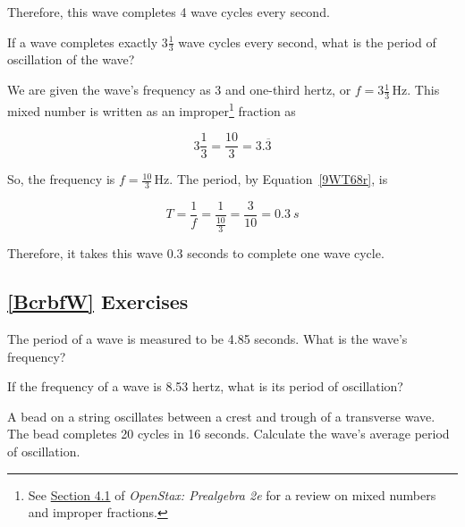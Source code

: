 \documentclass{article}
\numberwithin{equation}{section}
\numberwithin{figure}{section}
\begin{document}
Therefore, this wave completes 4 wave cycles every second.

\solutionEnd

\begin{example}
    If a wave completes exactly $3 \frac{1}{3}$ wave cycles every second, what is the period of oscillation of the wave? 
\end{example}

\Solution We are given the wave's frequency as 3 and one-third hertz, or $f = 3\frac{1}{3}\,\text{Hz}$. This mixed number is written as an improper\footnote{See \href{https://openstax.org/books/prealgebra-2e/pages/4-1-visualize-fractions}{Section 4.1} of \textit{OpenStax: Prealgebra 2e} for a review on mixed numbers and improper fractions.} fraction as

\begin{equation*}
    3 \frac{1}{3} = \frac{10}{3} = 3.\overline{3}
\end{equation*}

So, the frequency is $f = \frac{10}{3}\,\text{Hz}$. The period, by Equation~\eqref{9WT68r}, is

\begin{equation*}
    T = \frac{1}{f} = \frac{1}{\frac{10}{3}} = \frac{3}{10}  = \SI{0.3}{s}
\end{equation*}

Therefore, it takes this wave 0.3 seconds to complete one wave cycle. 

\solutionEnd

\subsection*{\ref{BcrbfW} Exercises}

\begin{exercise} \label{XGViXs}
    The period of a wave is measured to be 4.85 seconds. What is the wave's frequency?
\end{exercise} 

\begin{exercise} \label{EeHAB4} 
    If the frequency of a wave is 8.53 hertz, what is its period of oscillation?
\end{exercise}

\begin{exercise} \label{ldTSm3} 
    A bead on a string oscillates between a crest and trough of a transverse wave. The bead completes 20 cycles in 16 seconds. Calculate the wave's average period of oscillation. 
\end{exercise}
\end{document}
